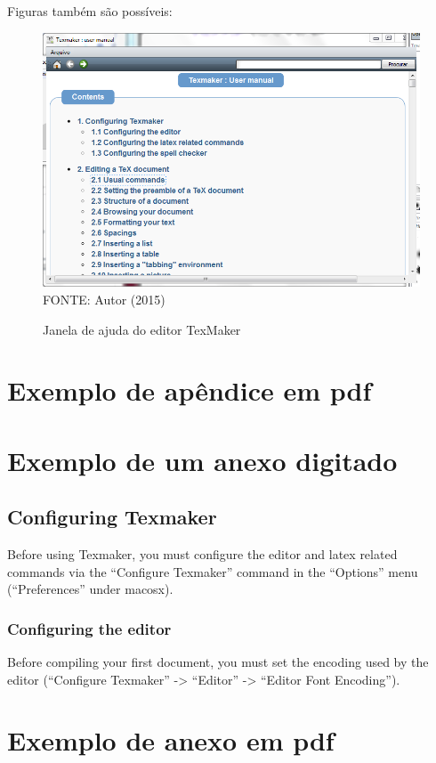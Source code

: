 \begin{apendicesenv}
	Figuras também são possíveis:
		
	\begin{figure}[H]
	\centering
	\caption{Janela de ajuda do editor TexMaker}
	\includegraphics[scale=0.5]
	{img/fig16.png}\label{fig16}\\
	FONTE: Autor (2015)
	\end{figure}

\chapter{Exemplo de apêndice em pdf}

\end{apendicesenv}

\begin{anexosenv}




\chapter{Exemplo de um anexo digitado}
\section*{Configuring Texmaker}
Before using Texmaker, you must configure the editor and latex related commands via the ``Configure Texmaker'' command in the ``Options'' menu (``Preferences'' under macosx).
\subsection*{Configuring the editor}

Before compiling your first document, you must set the encoding used by the editor (``Configure Texmaker'' -> ``Editor'' -> ``Editor Font Encoding''). 


\chapter{Exemplo de anexo em pdf}

\end{anexosenv}
